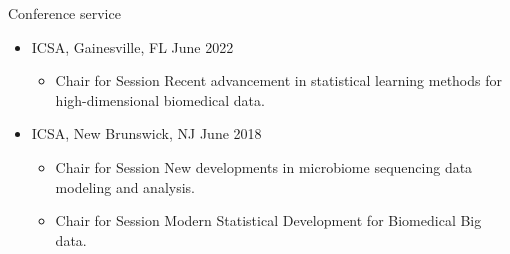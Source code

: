 \documentclass{resume} %
\begin{document}


\begin{rSection}{Conference service}

\begin{itemize}[noitemsep,topsep=0pt]

\item  ICSA, Gainesville, FL  \hfill {June 2022}
\begin{itemize}[noitemsep,topsep=0pt]
\item{Chair for Session Recent advancement in statistical learning methods for high-dimensional biomedical data.}
\end{itemize}


\item  ICSA, New Brunswick, NJ  \hfill {June 2018}
\begin{itemize}[noitemsep,topsep=0pt]
\item{Chair for Session New developments in microbiome sequencing data modeling and analysis.}
\item{Chair for Session Modern Statistical Development for Biomedical Big data.}
\end{itemize}


\end{itemize}

\end{rSection}
\end{document}
